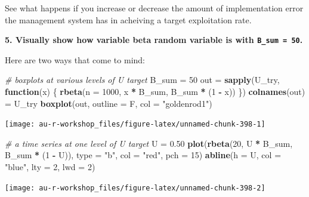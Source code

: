 \documentclass[]{book}
\newenvironment{Shaded}{\begin{snugshade}}{\end{snugshade}}
\newcommand{\KeywordTok}[1]{\textcolor[rgb]{0.13,0.29,0.53}{\textbf{#1}}}
\newcommand{\DataTypeTok}[1]{\textcolor[rgb]{0.13,0.29,0.53}{#1}}
\newcommand{\DecValTok}[1]{\textcolor[rgb]{0.00,0.00,0.81}{#1}}
\newcommand{\FloatTok}[1]{\textcolor[rgb]{0.00,0.00,0.81}{#1}}
\newcommand{\StringTok}[1]{\textcolor[rgb]{0.31,0.60,0.02}{#1}}
\newcommand{\CommentTok}[1]{\textcolor[rgb]{0.56,0.35,0.01}{\textit{#1}}}
\newcommand{\ControlFlowTok}[1]{\textcolor[rgb]{0.13,0.29,0.53}{\textbf{#1}}}
\newcommand{\OperatorTok}[1]{\textcolor[rgb]{0.81,0.36,0.00}{\textbf{#1}}}
\newcommand{\NormalTok}[1]{#1}
\theoremstyle{definition}
\theoremstyle{definition}
\theoremstyle{definition}
\theoremstyle{remark}
\begin{document}
See what happens if you increase or decrease the amount of
implementation error the management system has in acheiving a target
exploitation rate.

\textbf{5. Visually show how variable beta random variable is with
\texttt{B\_sum\ =\ 50}.}

Here are two ways that come to mind:

\begin{Shaded}
\begin{Highlighting}[]
\CommentTok{# boxplots at various levels of U target}
\NormalTok{B_sum =}\StringTok{ }\DecValTok{50}
\NormalTok{out =}\StringTok{ }\KeywordTok{sapply}\NormalTok{(U_try, }\ControlFlowTok{function}\NormalTok{(x) \{}
  \KeywordTok{rbeta}\NormalTok{(}\DataTypeTok{n =} \DecValTok{1000}\NormalTok{, x }\OperatorTok{*}\StringTok{ }\NormalTok{B_sum, B_sum }\OperatorTok{*}\StringTok{ }\NormalTok{(}\DecValTok{1} \OperatorTok{-}\StringTok{ }\NormalTok{x))}
\NormalTok{\})}
\KeywordTok{colnames}\NormalTok{(out) =}\StringTok{ }\NormalTok{U_try}
\KeywordTok{boxplot}\NormalTok{(out, }\DataTypeTok{outline =}\NormalTok{ F, }\DataTypeTok{col =} \StringTok{"goldenrod1"}\NormalTok{)}
\end{Highlighting}
\end{Shaded}

\begin{center}\texttt{[image: au-r-workshop\_files/figure-latex/unnamed-chunk-398-1]} \end{center}

\begin{Shaded}
\begin{Highlighting}[]
\CommentTok{# a time series at one level of U target}
\NormalTok{U =}\StringTok{ }\FloatTok{0.50}
\KeywordTok{plot}\NormalTok{(}\KeywordTok{rbeta}\NormalTok{(}\DecValTok{20}\NormalTok{, U }\OperatorTok{*}\StringTok{ }\NormalTok{B_sum, B_sum }\OperatorTok{*}\StringTok{ }\NormalTok{(}\DecValTok{1} \OperatorTok{-}\StringTok{ }\NormalTok{U)), }\DataTypeTok{type =} \StringTok{"b"}\NormalTok{, }\DataTypeTok{col =} \StringTok{"red"}\NormalTok{, }\DataTypeTok{pch =} \DecValTok{15}\NormalTok{)}
\KeywordTok{abline}\NormalTok{(}\DataTypeTok{h =}\NormalTok{ U, }\DataTypeTok{col =} \StringTok{"blue"}\NormalTok{, }\DataTypeTok{lty =} \DecValTok{2}\NormalTok{, }\DataTypeTok{lwd =} \DecValTok{2}\NormalTok{)}
\end{Highlighting}
\end{Shaded}

\begin{center}\texttt{[image: au-r-workshop\_files/figure-latex/unnamed-chunk-398-2]} \end{center}
\end{document}
